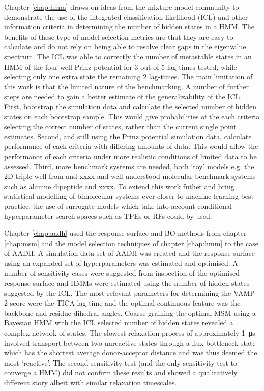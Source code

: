 Chapter \ref{chap:hmm} draws on ideas from the mixture model community to demonstrate the use of the integrated classification likelihood (ICL) and other information criteria in determining  the number of hidden states in a HMM.  The benefits of these type of model selection metrics are that they are easy to calculate and do not rely on being able to resolve clear gaps in the eigenvalue spectrum. The ICL was able to correctly the number of metastable states in an HMM of the four well Prinz potential for 3 out of \num{5} lag times tested, while selecting only one extra state the remaining \num{2} lag-times.  The main limitation of this work is that the limited nature of the benchmarking. A number of further steps are needed to gain a better estimate of the generalizability of the ICL. First, bootstrap the simulation data and calculate the selected number of hidden states on each bootstrap sample. This would give probabilities of the each criteria selecting the correct number of states, rather than the current single point estimates. Second, and still using the Prinz potential simulation data, calculate performance of each criteria with differing amounts of data. This would allow the performance of each criteria under more realistic conditions of limited data to be assessed. Third, more benchmark systems are needed, both `toy' models e.g. the 2D triple well from \cite{noeProjectedHiddenMarkov2013a} and xxxx and well understood molecular benchmark systems such as alanine dipeptide and xxxx.  To extend this work futher and bring statistical modelling of bimolecular systems ever closer to machine learning best practice, the use of surrogate models which take into account conditional hyperparameter search spaces such as TPEs or RFs could by used. 

Chapter \ref{chap:aadh} used the response surface and BO methods from chapter \ref{chap:msm} and the model selection techniques of chapter \ref{chap:hmm} to the case of AADH. A simulation data set of AADH was created and the response surface using an expanded set of hyperparameters was estimated and optimised. A number of sensitivity cases were suggested from inspection of the optimised response surface and HMMs were estimated using the number of hidden states suggested by the ICL. The most relevant parameters for determining the VAMP-2 score were the TICA lag time and the optimal continuous feature was the backbone and residue dihedral angles. Coarse graining the optimal MSM using a Bayesian HMM with the ICL selected number of hidden states revealed a complex network of states. The slowest relaxation process of approximately \SI{1}{\micro\second} involved transport between two unreactive states through a flux bottleneck state which has the shortest average donor-acceptor distance and was thus deemed the most `reactive'. The second sensitivity test (and the only sensitivity test to converge a HMM) did not confirm these results and showed a qualitatively different story albeit with similar relaxation timescales. 

